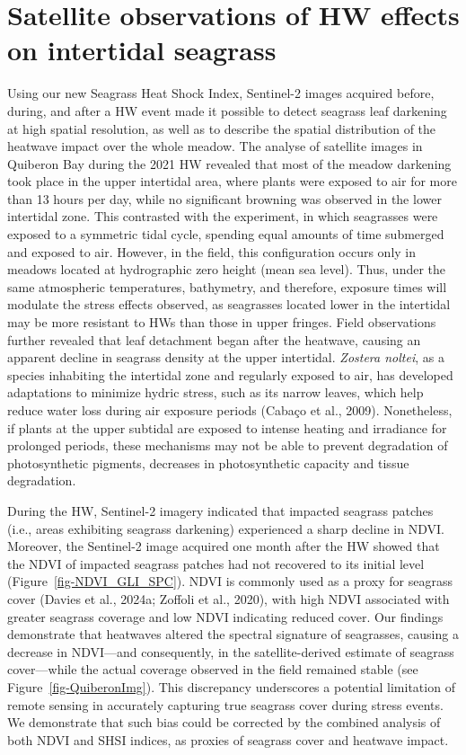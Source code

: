 \documentclass[
  letterpaper,
  DIV=11,
  numbers=noendperiod]{scrartcl}
\begin{document}
\section{Satellite observations of HW effects on intertidal
seagrass}\label{satellite-observations-of-hw-effects-on-intertidal-seagrass}

Using our new Seagrass Heat Shock Index, Sentinel-2 images acquired
before, during, and after a HW event made it possible to detect seagrass
leaf darkening at high spatial resolution, as well as to describe the
spatial distribution of the heatwave impact over the whole meadow. The
analyse of satellite images in Quiberon Bay during the 2021 HW revealed
that most of the meadow darkening took place in the upper intertidal
area, where plants were exposed to air for more than 13 hours per day,
while no significant browning was observed in the lower intertidal zone.
This contrasted with the experiment, in which seagrasses were exposed to
a symmetric tidal cycle, spending equal amounts of time submerged and
exposed to air. However, in the field, this configuration occurs only in
meadows located at hydrographic zero height (mean sea level). Thus,
under the same atmospheric temperatures, bathymetry, and therefore,
exposure times will modulate the stress effects observed, as seagrasses
located lower in the intertidal may be more resistant to HWs than those
in upper fringes. Field observations further revealed that leaf
detachment began after the heatwave, causing an apparent decline in
seagrass density at the upper intertidal. \emph{Zostera noltei}, as a
species inhabiting the intertidal zone and regularly exposed to air, has
developed adaptations to minimize hydric stress, such as its narrow
leaves, which help reduce water loss during air exposure periods (Cabaço
et al., 2009). Nonetheless, if plants at the upper subtidal are exposed
to intense heating and irradiance for prolonged periods, these
mechanisms may not be able to prevent degradation of photosynthetic
pigments, decreases in photosynthetic capacity and tissue degradation.

During the HW, Sentinel-2 imagery indicated that impacted seagrass
patches (i.e., areas exhibiting seagrass darkening) experienced a sharp
decline in NDVI. Moreover, the Sentinel-2 image acquired one month after
the HW showed that the NDVI of impacted seagrass patches had not
recovered to its initial level (Figure~\ref{fig-NDVI_GLI_SPC}). NDVI is
commonly used as a proxy for seagrass cover (Davies et al., 2024a;
Zoffoli et al., 2020), with high NDVI associated with greater seagrass
coverage and low NDVI indicating reduced cover. Our findings demonstrate
that heatwaves altered the spectral signature of seagrasses, causing a
decrease in NDVI---and consequently, in the satellite-derived estimate
of seagrass cover---while the actual coverage observed in the field
remained stable (see Figure~\ref{fig-QuiberonImg}). This discrepancy
underscores a potential limitation of remote sensing in accurately
capturing true seagrass cover during stress events. We demonstrate that
such bias could be corrected by the combined analysis of both NDVI and
SHSI indices, as proxies of seagrass cover and heatwave impact.
\end{document}
